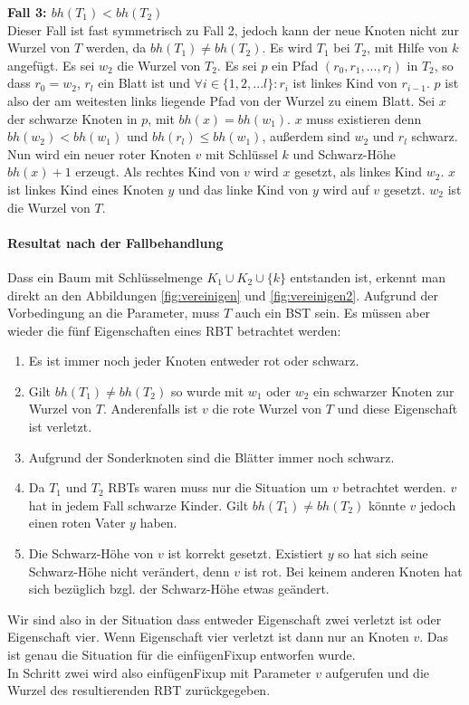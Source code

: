 \documentclass[a4paper,12pt]{article}
\begin{document}
\noindent\textbf{Fall 3: $bh(T_1) < bh(T_2)$ }\\ 
Dieser Fall ist fast symmetrisch zu Fall 2, jedoch kann der neue Knoten nicht zur Wurzel von $T$ werden, da $bh(T_1) \neq bh(T_2)$.
Es wird $T_1$ bei $T_2$, mit Hilfe von $k$ angefügt. Es sei $w_2$ die Wurzel von $T_2$. Es sei $p$ ein Pfad $(r_0,r_1,...,r_l)$ in $T_2$, so dass $r_0 = w_2$, $r_l$ ein Blatt ist und $\forall i \in \{1,2,...l\} \colon r_i$  ist linkes Kind von  $r_{i-1}$. $p$ ist also der am weitesten links liegende Pfad von der Wurzel zu einem Blatt. Sei $x$ der schwarze Knoten in $p$, mit $\mathit{bh}(x) = \mathit{bh}(w_1)$. $x$ muss existieren denn $\mathit{bh}(w_2) < \mathit{bh}(w_1)$ und $\mathit{bh}(r_l) \leq  \mathit{bh}(w_1)$, außerdem sind $w_2$ und $r_l$ schwarz.\\
Nun wird ein neuer roter Knoten $v$ mit Schlüssel $k$ und Schwarz-Höhe $\mathit{bh}(x) + 1$ erzeugt. Als rechtes Kind von $v$  wird $x$ gesetzt, als linkes Kind $w_2$. $x$ ist linkes Kind eines Knoten $y$ und das linke Kind von $y$ wird auf $v$ gesetzt. $w_2$ ist die Wurzel von $T$. \\   
\paragraph{Resultat nach der Fallbehandlung}
Dass ein Baum mit Schlüsselmenge  $K_1 \cup K_2 \cup \{k\} $ entstanden ist, erkennt man direkt an den Abbildungen \ref{fig:vereinigen} und \ref{fig:vereinigen2}. Aufgrund der Vorbedingung an die Parameter, muss $T$ auch ein BST sein. Es müssen aber wieder die fünf Eigenschaften eines RBT betrachtet werden:
\begin{enumerate}
	\item Es ist immer noch jeder Knoten entweder rot oder schwarz.
	\item Gilt $bh(T_1) \neq bh(T_2)$ so wurde mit $w_1$ oder $w_2$ ein schwarzer Knoten zur Wurzel von $T$. Anderenfalls ist $v$ die rote Wurzel von $T$ und diese Eigenschaft ist verletzt.   
	\item Aufgrund der Sonderknoten sind die Blätter immer noch schwarz.
	\item Da $T_1$ und $T_2$ RBTs waren muss nur die Situation um $v$ betrachtet werden. $v$ hat in jedem Fall schwarze Kinder. Gilt $bh(T_1) \neq bh(T_2)$ könnte $v$ jedoch einen roten Vater $y$ haben. 
	\item Die Schwarz-Höhe von $v$ ist korrekt gesetzt. Existiert $y$ so hat sich seine Schwarz-Höhe nicht verändert, denn $v$ ist rot. Bei keinem anderen Knoten hat sich bezüglich bzgl. der Schwarz-Höhe etwas geändert. 
\end{enumerate} 
 Wir sind also in der Situation dass entweder Eigenschaft zwei verletzt ist oder Eigenschaft vier. Wenn Eigenschaft vier verletzt ist dann nur an Knoten $v$. Das ist genau die Situation für die einfügenFixup entworfen wurde.\\
 In Schritt zwei wird also einfügenFixup mit Parameter $v$ aufgerufen und die Wurzel des resultierenden RBT zurückgegeben. 
\end{document}
